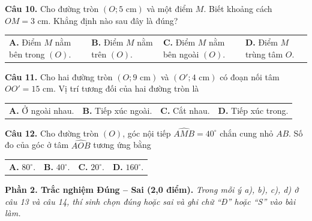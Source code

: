\documentclass[11pt,a4paper]{article}
\begin{document}
\vspace{1.5mm}
\textbf{Câu 10.} Cho đường tròn $(O; 5\text{ cm})$ và một điểm $M$. Biết khoảng cách $OM = 3\text{ cm}$. Khẳng định nào sau đây là đúng?\\
\begin{tabularx}{\linewidth}{XXXX}
\textbf{A.} Điểm $M$ nằm bên trong $(O)$. & \textbf{B.} Điểm $M$ nằm trên $(O)$. & \textbf{C.} Điểm $M$ nằm bên ngoài $(O)$. & \textbf{D.} Điểm $M$ trùng tâm $O$.
\end{tabularx}

\vspace{1.5mm}
\textbf{Câu 11.} Cho hai đường tròn $(O; 9\text{ cm})$ và $(O'; 4\text{ cm})$ có đoạn nối tâm $OO' = 15\text{ cm}$. Vị trí tương đối của hai đường tròn là\\
\begin{tabularx}{\linewidth}{XXXX}
\textbf{A.} Ở ngoài nhau. & \textbf{B.} Tiếp xúc ngoài. & \textbf{C.} Cắt nhau. & \textbf{D.} Tiếp xúc trong.
\end{tabularx}

\vspace{1.5mm}
\textbf{Câu 12.} Cho đường tròn $(O)$, góc nội tiếp $\widehat{AMB} = 40^\circ$ chắn cung nhỏ $AB$. Số đo của góc ở tâm $\widehat{AOB}$ tương ứng bằng\\
\begin{tabularx}{\linewidth}{XXXX}
\textbf{A.} $80^\circ$. & \textbf{B.} $40^\circ$. & \textbf{C.} $20^\circ$. & \textbf{D.} $160^\circ$.
\end{tabularx}

\vspace{3mm}
\noindent
\textbf{Phần 2. Trắc nghiệm Đúng -- Sai (2,0 điểm).} \textit{Trong mỗi ý a), b), c), d) ở câu 13 và câu 14, thí sinh chọn đúng hoặc sai và ghi chữ ``Đ'' hoặc ``S'' vào bài làm.}
\end{document}
